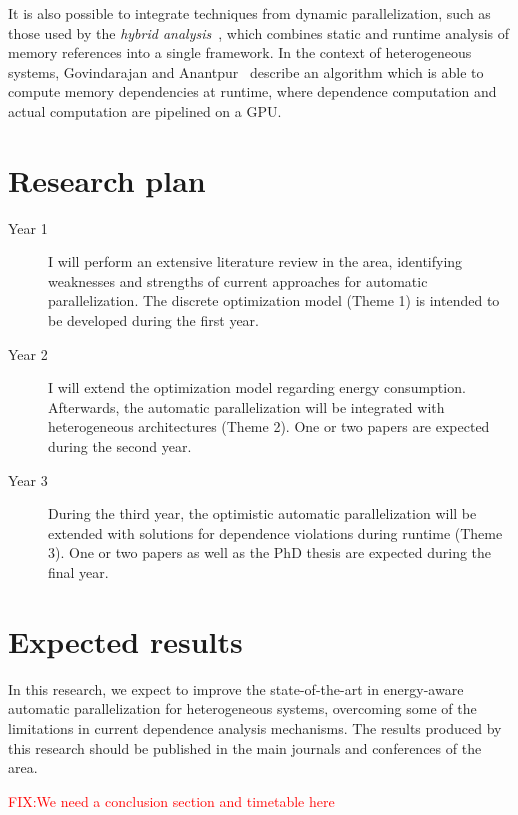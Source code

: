 \documentclass[a4paper,12pt]{article}
\newcommand\FIXME[1]{\textcolor{red}{FIX:}\textcolor{red}{#1}}
\begin{document}
It is also possible to integrate techniques from dynamic parallelization, such
as those used by the \emph{hybrid analysis}~\cite{rus03}, which combines static
and runtime analysis of memory references into a single framework.  In the
context of heterogeneous systems, Govindarajan and
Anantpur~\cite{govindarajan13} describe an algorithm which is able to compute
memory dependencies at runtime, where dependence computation and actual
computation are pipelined on a GPU.

\section{Research plan}

\begin{description}

\item[Year 1] I will perform an extensive literature review in the area,
identifying weaknesses and strengths of current approaches for automatic
parallelization.  The discrete optimization model (Theme 1) is intended to be
developed during the first year.

\item[Year 2] I will extend the optimization model regarding energy
consumption.  Afterwards, the automatic parallelization will be integrated with
heterogeneous architectures (Theme 2).  One or two papers are expected during
the second year.   

\item[Year 3] During the third year, the optimistic automatic parallelization
will be extended with solutions for dependence violations during runtime (Theme
3).  One or two papers as well as the PhD thesis are expected during the final
year.

\end{description}

\section{Expected results}

In this research, we expect to improve the state-of-the-art in energy-aware
automatic parallelization for heterogeneous systems, overcoming some of the
limitations in current dependence analysis mechanisms.  The results produced by
this research should be published in the main journals and conferences of the
area.

\FIXME{We need a conclusion section and timetable here}



\end{document}
